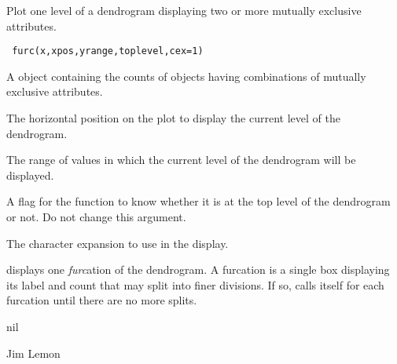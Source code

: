 \begin{Description}\relax
Plot one level of a dendrogram displaying two or more mutually 
exclusive attributes.
\end{Description}
\begin{Usage}
\begin{verbatim}
 furc(x,xpos,yrange,toplevel,cex=1)
\end{verbatim}
\end{Usage}
\begin{Arguments}
\begin{ldescription}
\item[\code{x}] A  object containing the counts of objects having
combinations of mutually exclusive attributes.
\item[\code{xpos}] The horizontal position on the plot to display the current level
of the dendrogram.
\item[\code{yrange}] The range of values in which the current level of the dendrogram
will be displayed.
\item[\code{toplevel}] A flag for the function to know whether it is at the top level
of the dendrogram or not. Do not change this argument.
\item[\code{cex}] The character expansion to use in the display.
\end{ldescription}
\end{Arguments}
\begin{Details}\relax
{} displays one \emph{furc}ation of the dendrogram. A furcation is
a single box displaying its label and count that may split into finer
divisions. If so,  calls itself for each furcation until there are
no more splits.
\end{Details}
\begin{Value}
nil
\end{Value}
\begin{Author}\relax
Jim Lemon
\end{Author}
\begin{SeeAlso}\relax
{}
\end{SeeAlso}

